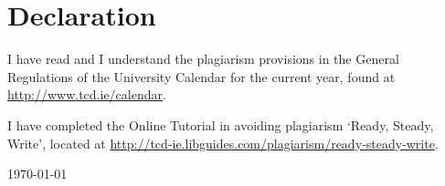 \clearpage
\thispagestyle{empty}
\section*{Declaration}
\label{sec:SOOA}

\vspace{1cm}

I have read and I understand the plagiarism provisions in the General 
Regulations of the University Calendar for the current year, found at 
\url{http://www.tcd.ie/calendar}.

\vspace{1cm}

\noindent
I have completed the Online Tutorial in avoiding plagiarism ‘Ready, Steady, 
Write’, located at \url{http://tcd‐ie.libguides.com/plagiarism/ready‐steady‐write}.

\vspace{1cm}
\noindent
\textbf{\thesisauthor{}} 

\vspace{0.5cm}
\noindent
\today
